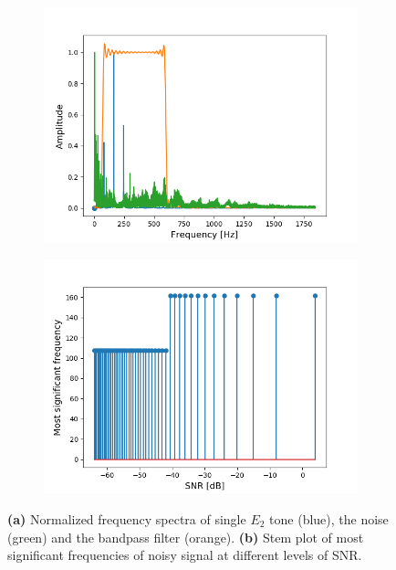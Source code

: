 \begin{figure}[H]
\begin{subfigure}{0.49\textwidth}
\centering
\includegraphics[width=\textwidth]{figures/SNR/single_spectrum.png}
\caption{}
\label{fig:single_spectrum}
\end{subfigure}
\begin{subfigure}{0.49\textwidth}
\centering
\includegraphics[width=\textwidth]{figures/SNR/single_stem.png}
\caption{}
\label{fig:single_stem}
\end{subfigure}
\caption{\textbf{(a)} Normalized frequency spectra of single $E_2$ tone (blue), the noise (green) and the bandpass filter (orange). \textbf{(b)} Stem plot of most significant frequencies of noisy signal at different levels of SNR.}
\label{fig:single_noise}
\end{figure}

